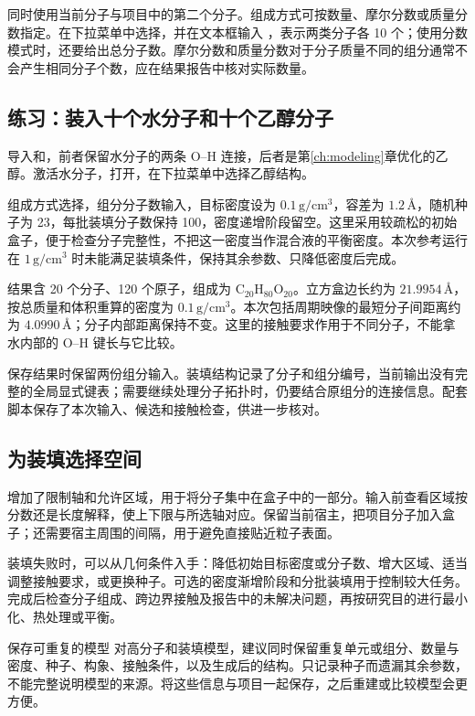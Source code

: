 同时使用当前分子与项目中的第二个分子。组成方式可按数量、摩尔分数或质量分数指定。在下拉菜单中选择，并在文本框输入 ，表示两类分子各 10 个；使用分数模式时，还要给出总分子数。摩尔分数和质量分数对于分子质量不同的组分通常不会产生相同分子个数，应在结果报告中核对实际数量。

\subsection{练习：装入十个水分子和十个乙醇分子}

导入和，前者保留水分子的两条 O--H 连接，后者是第\ref{ch:modeling}章优化的乙醇。激活水分子，打开，在下拉菜单中选择乙醇结构。

组成方式选择，组分分子数输入，目标密度设为 $0.1\,\mathrm{g/cm^3}$，容差为 $1.2\,\text{\AA}$，随机种子为 23，每批装填分子数保持 100，密度递增阶段留空。这里采用较疏松的初始盒子，便于检查分子完整性，不把这一密度当作混合液的平衡密度。本次参考运行在 $1\,\mathrm{g/cm^3}$ 时未能满足装填条件，保持其余参数、只降低密度后完成。

结果含 20 个分子、120 个原子，组成为 $\mathrm{C_{20}H_{80}O_{20}}$。立方盒边长约为 $21.9954\,\text{\AA}$，按总质量和体积重算的密度为 $0.1\,\mathrm{g/cm^3}$。本次包括周期映像的最短分子间距离约为 $4.0990\,\text{\AA}$；分子内部距离保持不变。这里的接触要求作用于不同分子，不能拿水内部的 O--H 键长与它比较。

保存结果时保留两份组分输入。装填结构记录了分子和组分编号，当前输出没有完整的全局显式键表；需要继续处理分子拓扑时，仍要结合原组分的连接信息。配套脚本保存了本次输入、候选和接触检查，供进一步核对。

\subsection{为装填选择空间}

增加了限制轴和允许区域，用于将分子集中在盒子中的一部分。输入前查看区域按分数还是长度解释，使上下限与所选轴对应。保留当前宿主，把项目分子加入盒子；还需要宿主周围的间隔，用于避免直接贴近粒子表面。

装填失败时，可以从几何条件入手：降低初始目标密度或分子数、增大区域、适当调整接触要求，或更换种子。可选的密度渐增阶段和分批装填用于控制较大任务。完成后检查分子组成、跨边界接触及报告中的未解决问题，再按研究目的进行最小化、热处理或平衡。

\begin{notebox}{保存可重复的模型}
对高分子和装填模型，建议同时保留重复单元或组分、数量与密度、种子、构象、接触条件，以及生成后的结构。只记录种子而遗漏其余参数，不能完整说明模型的来源。将这些信息与项目一起保存，之后重建或比较模型会更方便。
\end{notebox}
